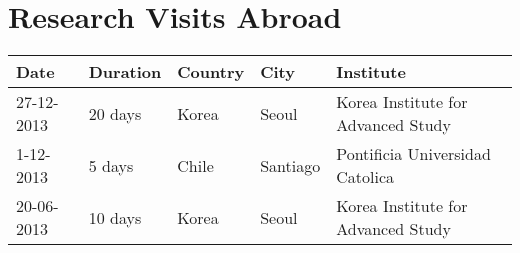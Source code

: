 \documentclass{report}
\begin{document}
\section*{Research Visits Abroad}

\begin{tabular}{p{2.0cm} p{1.5cm} p{1.5cm} p{1.5cm} p{5.5cm}}\hline
Date & Duration & Country & City & Institute\\\hline
27-12-2013 & 20 days & Korea & Seoul & Korea Institute for Advanced Study\\
1-12-2013 & 5 days & Chile & Santiago & Pontificia Universidad Catolica\\
20-06-2013 & 10 days & Korea & Seoul & Korea Institute for Advanced Study
\end{tabular}
\end{document}
